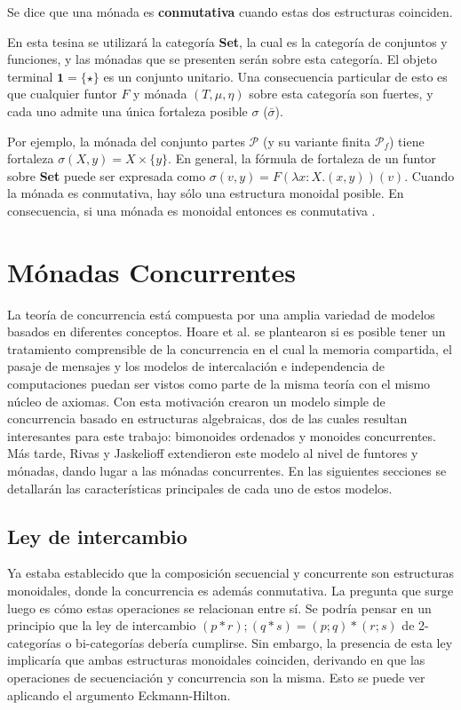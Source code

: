 Se dice que una mónada es \textbf{conmutativa} cuando estas dos estructuras coinciden.

En esta tesina se utilizará la categoría \textbf{Set}, la cual es la categoría de conjuntos y funciones, y las mónadas que se presenten serán sobre esta categoría. El objeto terminal $\mathbf{1} = \{\star\}$ es un conjunto unitario. Una consecuencia particular de esto es que cualquier funtor $\mathit{F}$ y mónada $(\mathit{T},\mu,\eta)$ sobre esta categoría son fuertes, y cada uno admite una única fortaleza posible $\sigma$ ($\bar{\sigma}$). 

Por ejemplo, la mónada del conjunto partes $\mathcal{P}$ (y su variante finita $\mathcal{P}_f$) tiene fortaleza $\sigma(X,y) = X \times \{y\}$. En general, la fórmula de fortaleza de un funtor sobre \textbf{Set} puede ser expresada como $\sigma(v,y) = \mathit{F}(\lambda x : X . (x,y))(v)$. Cuando la mónada es conmutativa, hay sólo una estructura monoidal posible. En consecuencia, si una mónada es monoidal entonces es conmutativa \cite{kock:1970}. 

\section{Mónadas Concurrentes}\label{monconc:mc}

La teoría de concurrencia está compuesta por una amplia variedad de modelos basados en diferentes conceptos. Hoare et al. \cite{hoare:2011} se plantearon si es posible tener un tratamiento comprensible de la concurrencia en el cual la memoria compartida, el pasaje de mensajes y los modelos de intercalación e independencia de computaciones puedan ser vistos como parte de la misma teoría con el mismo núcleo de axiomas. Con esta motivación crearon un modelo simple de concurrencia basado en estructuras algebraicas, dos de las cuales resultan interesantes para este trabajo: bimonoides ordenados y monoides concurrentes. Más tarde, Rivas y Jaskelioff \cite{rivas:2019} extendieron este modelo al nivel de funtores y mónadas, dando lugar a las mónadas concurrentes. En las siguientes secciones se detallarán las características principales de cada uno de estos modelos.

\subsection{Ley de intercambio}\label{mc:interchange}

Ya estaba establecido que la composición secuencial y concurrente son estructuras monoidales, donde la concurrencia es además conmutativa. La pregunta que surge luego es cómo estas operaciones se relacionan entre sí. Se podría pensar en un principio que la ley de intercambio $(p * r) ; (q * s) = (p ; q) * (r ; s)$ de 2-categorías o bi-categorías debería cumplirse.  Sin embargo, la presencia de esta ley implicaría que ambas estructuras monoidales coinciden, derivando en que las operaciones de secuenciación y concurrencia son la misma. Esto se puede ver aplicando el argumento Eckmann-Hilton. 

